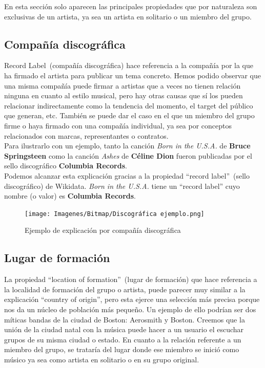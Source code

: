 En esta sección solo aparecen las principales propiedades que por naturaleza son exclusivas de un artista, ya sea un artista en solitario o un miembro del grupo.\\

\subsection*{Compañía discográfica}

Record Label~(compañía discográfica) hace referencia a la compañía por la que ha firmado el artista para publicar un tema concreto. Hemos podido observar que una misma compañía puede firmar a artistas que a veces no tienen relación ninguna en cuanto al estilo musical, pero hay otras causas que sí los pueden relacionar indirectamente como la tendencia del momento, el target del público que generan, etc. También se puede dar el caso en el que un miembro del grupo firme o haya firmado con una compañía individual, ya sea por conceptos relacionados con marcas, representantes o contratos.\\

Para ilustrarlo con un ejemplo, tanto la canción \textit{Born in the U.S.A.} de \textbf{Bruce Springsteen} como la canción \textit{Ashes} de \textbf{Céline Dion} fueron publicadas por el sello discográfico \textbf{Columbia Records}.\\

Podemos alcanzar esta explicación gracias a la propiedad ``record label''~(sello discográfico) de Wikidata. \textit{Born in the U.S.A.} tiene un ``record label'' cuyo nombre (o valor) es \textbf{Columbia Records}.\\

\begin{figure}[h!]
	\centering
	\texttt{[image: Imagenes/Bitmap/Discográfica ejemplo.png]}
	\caption{Ejemplo de explicación por compañía discográfica}
	\label{fig:sampleImage}
\end{figure}

\subsection*{Lugar de formación}

La propiedad ``location of formation''~(lugar de formación) que hace referencia a la localidad de formación del grupo o artista, puede parecer muy similar a la explicación ``country of origin'', pero esta ejerce una selección más precisa porque nos da un núcleo de población más pequeño. Un ejemplo de ello podrían ser dos míticas bandas de la ciudad de Boston: Aerosmith y Boston. Creemos que la unión de la ciudad natal con la música puede hacer a un usuario el escuchar grupos de su misma ciudad o estado. En cuanto a la relación referente a un miembro del grupo, se trataría del lugar donde ese miembro se inició como músico ya sea como artista en solitario o en su grupo original.\\

